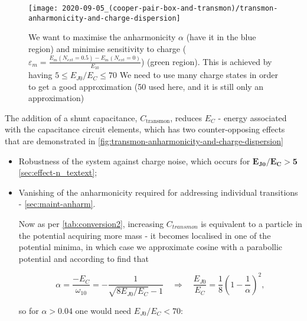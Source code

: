 \begin{figure}[h]
  \centering
  \texttt{[image: 2020-09-05\_(cooper-pair-box-and-transmon)/transmon-anharmonicity-and-charge-dispersion]}
  \caption{\small We want to  maximise the anharmonicity $\alpha$ (have it in the  blue region) and minimise sensitivity
    to charge ($\varepsilon_m = \frac{E_m(N_{ext}=0.5) -  E_m(N_{ext}=0)}{E_{10}}$) (green region).  This is achieved by
    having $5 \le  E_{J0}/E_C \le 70$ We need  to use many charge states in  order to get a good  approximation (50 used
    here, and it is still only an approximation)\label{fig:transmon-anharmonicity-and-charge-dispersion}}
\end{figure}

The addition  of a shunt capacitance,  $C_{\text{transmon}}$, reduces $E_{C}$  - energy associated with  the capacitance
circuit     elements,     which     has     two     counter-opposing    effects     that     are     demonstrated     in
\autoref{fig:transmon-anharmonicity-and-charge-dispersion}
\begin{itemize}
\item   Robustness  of   the   system  against   charge   noise,  which   occurs   for  $\mathbf{E_{J0}/E_C>5}$   \hfill
  \autoref{sec:effect-n_textext};
\item Vanishing  of the anharmonicity  required for addressing  individual transitions -    \cite{Kjaergaard_2020}  \hfill
  \autoref{sec:maint-anharm}.

  Now as per \autoref{tab:conversion2}, increasing $C_{transmon}$ is equivalent to a particle in the potential acquiring
  more mass - it becomes localised in one of the potential minima, in which case we approximate cosine with a parabollic
  potential and according to \cite{Koch_2007} find that

\begin{equation}\label{eq:transmon-anharmonicity}
  \alpha = \frac{-E_{C}}{\omega_{10}} = -\frac{1}{\sqrt{8E_{J0}/E_C} - 1} \quad \Rightarrow \quad \frac{E_{J0}}{E_C} = \frac{1}{8}\left( 1 - \frac{1}{\alpha} \right)^2,
\end{equation}

\noindent so for $\alpha>0.04$ one would need $E_{J0}/E_C < 70$:
\end{itemize}

